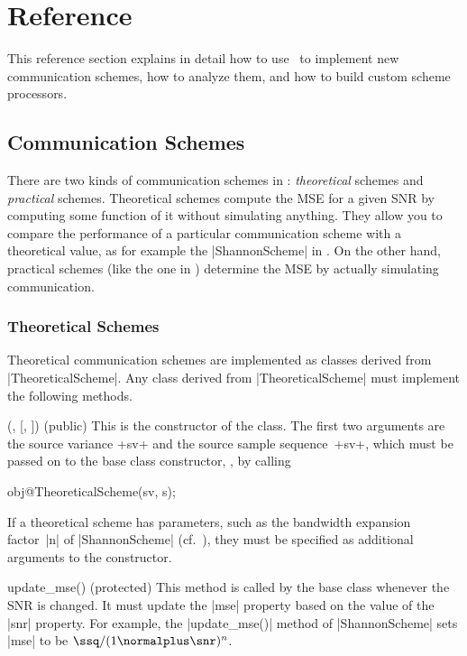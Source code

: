 \section{Reference}\label{sec:reference}

This reference section explains in detail how to use \jscsim\ to implement new
communication schemes, how to analyze them, and how to build custom scheme
processors. 


\subsection{Communication Schemes}

There are two kinds of communication schemes in \jscsim: \emph{theoretical}
schemes and \emph{practical} schemes. Theoretical schemes compute the MSE for a
given SNR by computing some function of it without simulating anything. They
allow you to compare the performance of a particular communication scheme with a
theoretical value, as for example the |ShannonScheme| in .
On the other hand, practical schemes (like the one in )
determine the MSE by actually simulating communication.


\subsubsection{Theoretical Schemes}

Theoretical communication schemes are implemented as classes derived from
|TheoreticalScheme|. Any class derived from |TheoreticalScheme| must implement
the following methods.

\begin{method}{(, 
  [, ]) (public)}
  This is the constructor of the class. The first two arguments are the source
  variance +sv+ and the source sample sequence~+sv+, which must be passed on to
  the base class constructor, \ie, by calling
  \begin{Code}
  obj@TheoreticalScheme(sv, s);
  \end{Code}

  If a theoretical scheme has parameters, such as the bandwidth expansion
  factor~|n| of |ShannonScheme| (cf.~), they must be
  specified as additional arguments to the constructor.
\end{method}

\begin{method}{update_mse(\obj) (protected)}
    This method is called by the base class whenever the SNR is changed. It
    must update the |mse| property based on the value of the |snr| property.
    For example, the |update_mse()| method of |ShannonScheme| sets |mse| to be
    $\ssq / (1 \normalplus \snr)^n$.
\end{method}


